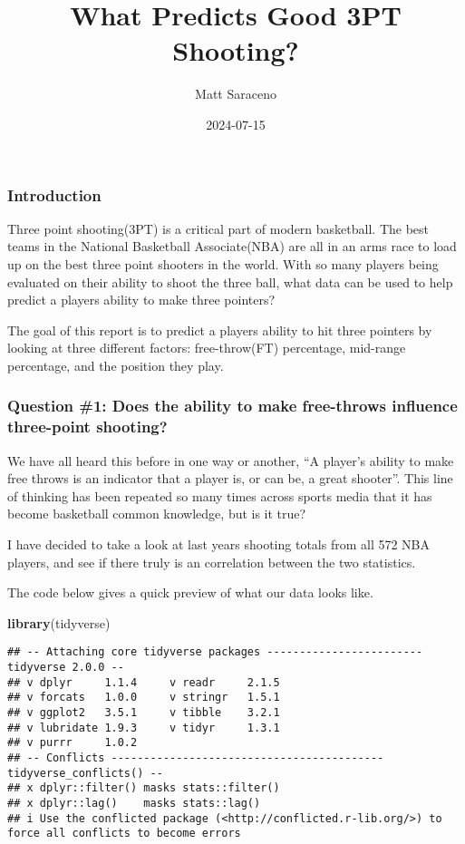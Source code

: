 \documentclass[
]{article}
\title{What Predicts Good 3PT Shooting?}
\author{Matt Saraceno}
\date{2024-07-15}
\newenvironment{Shaded}{\begin{snugshade}}{\end{snugshade}}
\newcommand{\FunctionTok}[1]{\textcolor[rgb]{0.13,0.29,0.53}{\textbf{#1}}}
\newcommand{\NormalTok}[1]{#1}
\begin{document}
\maketitle

\subsubsection{\texorpdfstring{\textbf{Introduction}}{Introduction}}\label{introduction}

Three point shooting(3PT) is a critical part of modern basketball. The
best teams in the National Basketball Associate(NBA) are all in an arms
race to load up on the best three point shooters in the world. With so
many players being evaluated on their ability to shoot the three ball,
what data can be used to help predict a players ability to make three
pointers?

The goal of this report is to predict a players ability to hit three
pointers by looking at three different factors: free-throw(FT)
percentage, mid-range percentage, and the position they play.

\subsubsection{\texorpdfstring{\textbf{Question \#1: Does the ability to
make free-throws influence three-point
shooting?}}{Question \#1: Does the ability to make free-throws influence three-point shooting?}}\label{question-1-does-the-ability-to-make-free-throws-influence-three-point-shooting}

We have all heard this before in one way or another, ``A player's
ability to make free throws is an indicator that a player is, or can be,
a great shooter''. This line of thinking has been repeated so many times
across sports media that it has become basketball common knowledge, but
is it true?

I have decided to take a look at last years shooting totals from all 572
NBA players, and see if there truly is an correlation between the two
statistics.

The code below gives a quick preview of what our data looks like.

\begin{Shaded}
\begin{Highlighting}[]
\FunctionTok{library}\NormalTok{(tidyverse)}
\end{Highlighting}
\end{Shaded}

\begin{verbatim}
## -- Attaching core tidyverse packages ------------------------ tidyverse 2.0.0 --
## v dplyr     1.1.4     v readr     2.1.5
## v forcats   1.0.0     v stringr   1.5.1
## v ggplot2   3.5.1     v tibble    3.2.1
## v lubridate 1.9.3     v tidyr     1.3.1
## v purrr     1.0.2     
## -- Conflicts ------------------------------------------ tidyverse_conflicts() --
## x dplyr::filter() masks stats::filter()
## x dplyr::lag()    masks stats::lag()
## i Use the conflicted package (<http://conflicted.r-lib.org/>) to force all conflicts to become errors
\end{verbatim}
\end{document}
